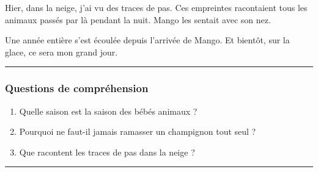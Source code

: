 \documentclass[
  french,
  french,
  14pt,
  a4paper]{extarticle}
\providecommand{\tightlist}{%
  \setlength{\itemsep}{0pt}\setlength{\parskip}{0pt}}
\begin{document}
{Hier, dans la neige, j'ai vu des traces de pas. Ces empreintes
racontaient tous les animaux passés par là pendant la nuit. Mango les
sentait avec son nez.

Une année entière s'est écoulée depuis l'arrivée de Mango. Et bientôt,
sur la glace, ce sera mon grand jour.

\begin{center}\rule{0.5\linewidth}{0.5pt}\end{center}

\subsubsection{Questions de
compréhension}\label{questions-de-compruxe9hension-13}

\begin{enumerate}
\def\labelenumi{\arabic{enumi}.}
\tightlist
\item
  Quelle saison est la saison des bébés animaux ?
\item
  Pourquoi ne faut-il jamais ramasser un champignon tout seul ?
\item
  Que racontent les traces de pas dans la neige ?
\end{enumerate}

\begin{center}\rule{0.5\linewidth}{0.5pt}\end{center}

}%
\newpage
\end{document}
